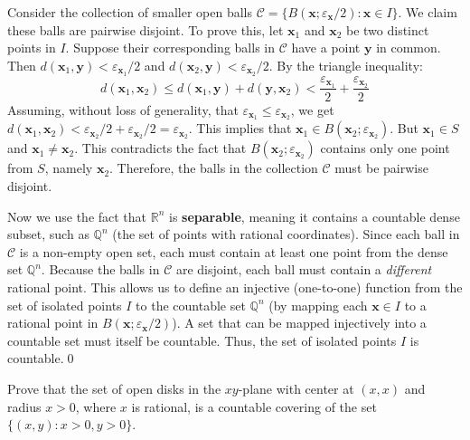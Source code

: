 Consider the collection of smaller open balls $\mathcal{C} = \{ B(\mathbf{x}; \varepsilon_{\mathbf{x}}/2) : \mathbf{x} \in I \}$. We claim these balls are pairwise disjoint.
To prove this, let $\mathbf{x}_1$ and $\mathbf{x}_2$ be two distinct points in $I$. Suppose their corresponding balls in $\mathcal{C}$ have a point $\mathbf{y}$ in common. Then $d(\mathbf{x}_1, \mathbf{y}) < \varepsilon_{\mathbf{x}_1}/2$ and $d(\mathbf{x}_2, \mathbf{y}) < \varepsilon_{\mathbf{x}_2}/2$.
By the triangle inequality:
$$d(\mathbf{x}_1, \mathbf{x}_2) \le d(\mathbf{x}_1, \mathbf{y}) + d(\mathbf{y}, \mathbf{x}_2) < \frac{\varepsilon_{\mathbf{x}_1}}{2} + \frac{\varepsilon_{\mathbf{x}_2}}{2}$$
Assuming, without loss of generality, that $\varepsilon_{\mathbf{x}_1} \le \varepsilon_{\mathbf{x}_2}$, we get $d(\mathbf{x}_1, \mathbf{x}_2) < \varepsilon_{\mathbf{x}_2}/2 + \varepsilon_{\mathbf{x}_2}/2 = \varepsilon_{\mathbf{x}_2}$.
This implies that $\mathbf{x}_1 \in B(\mathbf{x}_2; \varepsilon_{\mathbf{x}_2})$. But $\mathbf{x}_1 \in S$ and $\mathbf{x}_1 \neq \mathbf{x}_2$. This contradicts the fact that $B(\mathbf{x}_2; \varepsilon_{\mathbf{x}_2})$ contains only one point from $S$, namely $\mathbf{x}_2$.
Therefore, the balls in the collection $\mathcal{C}$ must be pairwise disjoint.

Now we use the fact that $\mathbb{R}^n$ is \textbf{separable}, meaning it contains a countable dense subset, such as $\mathbb{Q}^n$ (the set of points with rational coordinates).
Since each ball in $\mathcal{C}$ is a non-empty open set, each must contain at least one point from the dense set $\mathbb{Q}^n$. Because the balls in $\mathcal{C}$ are disjoint, each ball must contain a \textit{different} rational point.
This allows us to define an injective (one-to-one) function from the set of isolated points $I$ to the countable set $\mathbb{Q}^n$ (by mapping each $\mathbf{x} \in I$ to a rational point in $B(\mathbf{x}; \varepsilon_{\mathbf{x}}/2)$). A set that can be mapped injectively into a countable set must itself be countable.
Thus, the set of isolated points $I$ is countable.\qed


\begin{problembox}
\begin{problemstatement}
Prove that the set of open disks in the \(xy\)-plane with center at \( (x, x) \) and radius \( x > 0 \), where \( x \) is rational, is a countable covering of the set \( \{(x, y) : x > 0, y > 0\} \).
\end{problemstatement}
\end{problembox}

